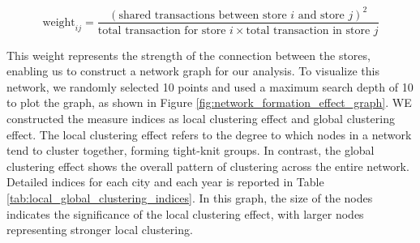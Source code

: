 \documentclass[11pt]{article}
\begin{document}
\begin{equation}
  \text{weight}_{ij} = \frac{(\text{shared transactions between store $i$ and store $j$})^2}{\text{total transaction for store $i$} \times \text{total transaction in store $j$}} \label{eq:weight_between_stores}
\end{equation}

This weight represents the strength of the connection between the stores, enabling us to construct a network graph for our analysis. To visualize this network, we randomly selected 10 points and used a maximum search depth of 10 to plot the graph, as shown in Figure \ref{fig:network_formation_effect_graph}. WE constructed the measure indices as local clustering effect and global clustering effect. The local clustering effect refers to the degree to which nodes in a network tend to cluster together, forming tight-knit groups. In contrast, the global clustering effect shows the overall pattern of clustering across the entire network. Detailed indices for each city and each year is reported in Table \ref{tab:local_global_clustering_indices}. In this graph, the size of the nodes indicates the significance of the local clustering effect, with larger nodes representing stronger local clustering. 

\end{document}

